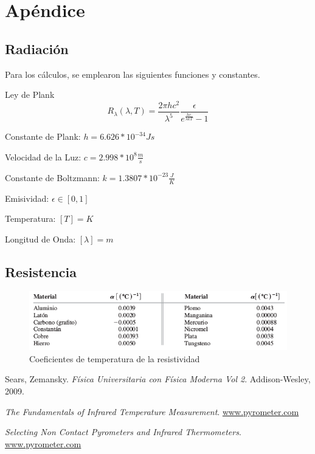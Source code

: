 \documentclass[12pt,a4paper]{article}
\begin{document}
\newpage
\section{Apéndice}
	\subsection{Radiación}\label{apendice_radiacion}
		Para los cálculos, se emplearon las siguientes funciones y constantes.
	
		Ley de Plank
			\begin{equation}\label{f_planck}
				\displaystyle R_{\lambda}(\lambda, T) = \frac{2 \pi h c^2}{\lambda ^5} \frac{\epsilon}{e^ {\frac{hc}{\lambda k T}} - 1}
			\end{equation}
	
			Constante de Plank: $h = 6.626 * 10^{-34} Js$
			
			Velocidad de la Luz: $c = 2.998 * 10^8 \frac{m}{s}$
			
			Constante de Boltzmann: $k = 1.3807 * 10^{-23} \frac{J}{K}$
			
			Emisividad: $\epsilon \in [0,1]$
			
			Temperatura: $[T] = K$
			
		Longitud de Onda: $[\lambda] = m$

	\subsection{Resistencia}\label{apendice_resistencia}
		\begin{figure}[H]
			\centering\includegraphics[scale=0.75]{images/tabla_coeficiente_resistividad.png}\caption{Coeficientes de temperatura de la resistividad}
		\end{figure}

\begin{thebibliography}{1}
		Sears, Zemansky.
		\textit{Física Universitaria con Física Moderna Vol 2}.
		Addison-Wesley, 2009.

		\textit{The Fundamentals of Infrared Temperature Measurement}.
		\href{www.pyrometer.com}{www.pyrometer.com}

		\textit{Selecting Non Contact Pyrometers and Infrared Thermometers}.
		\href{www.pyrometer.com}{www.pyrometer.com}

\end{thebibliography}
\end{document}

